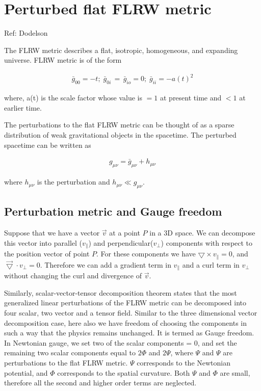 \documentclass[12pt]{article}
\newcommand{\beqa}{\begin{eqnarray}}
\newcommand{\eeqa}{\end{eqnarray}}
\numberwithin{equation}{section}
\begin{document}
\tableofcontents
\pagebreak

\section{Perturbed flat FLRW metric} \label{sec:metric_gauge}
\begin{center}
{\color{red}{Add more info about decomposition theorem and gauge}}

Ref: Dodelson
\end{center}
The FLRW metric describes a flat, isotropic, homogeneous, and expanding universe. FLRW metric is of the form 

\beqa
\bar{g}_{00} = -t; \; \bar{g}_{0i} \, = \, \bar{g}_{io} = 0; \; \bar{g}_{ii} = - a(t)^2
\eeqa

where, a(t) is the scale factor whose value is $ = 1$ at present time and $<1$ at earlier time.

The perturbations to the flat FLRW metric can be thought of as a sparse distribution of weak gravitational objects in the spacetime. The perturbed spacetime can be written as

\beqa
g_{\mu \nu} = \bar{g}_{\mu \nu}  + h_{\mu \nu}
\eeqa

where $h_{\mu \nu}$ is the perturbation and $h_{\mu \nu} \ll g_{\mu \nu}$.

\subsection{Perturbation metric and Gauge freedom} 
Suppose that we have a vector $\vec{v}$ at a point $P$ in a 3D space. We can decompose this vector into parallel ($v_{\parallel}$) and perpendicular($v_{\perp}$) components with respect to the position vector of point $P$. For these components we have $\bigtriangledown \times v_{\parallel} = 0$, and $\vec{\bigtriangledown}\cdot v_{\perp} = 0$. Therefore we can add a gradient term in $v_{\parallel}$ and a curl term in $v_{\perp}$ without changing the curl and divergence of $\vec{v}$.

Similarly, scalar-vector-tensor decomposition theorem states that the most generalized linear perturbations of the FLRW metric can be decomposed into four scalar, two vector and a tensor field. Similar to the three dimensional vector decomposition case, here also we have freedom of choosing the components in such a way that the physics remains unchanged. It is termed as Gauge freedom. In Newtonian gauge, we set two of the scalar components = 0, and set the remaining two scalar components equal to $2\Phi$ and $2\Psi$, where $\Psi$ and $\Psi$ are perturbations to the flat FLRW metric. $\Psi$ corresponds to the Newtonian potential, and $\Phi$ corresponds to the spatial curvature. Both $\Psi$ and $\Phi$ are small, therefore all the second and higher order terms are neglected.
\end{document}
